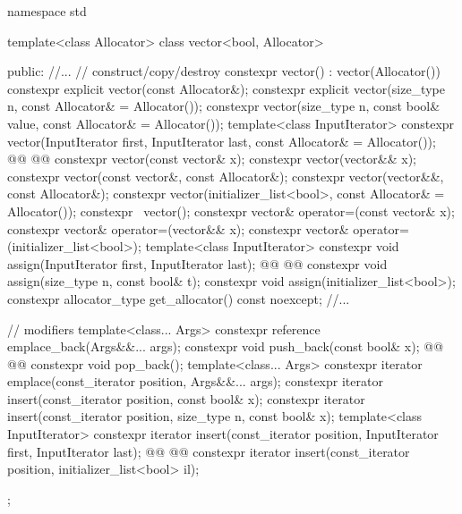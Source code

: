 \documentclass{wg21}
\begin{document}
\begin{codeblock}
namespace std {
    template<class Allocator>
    class vector<bool, Allocator> {
        public:
        //...
        // construct/copy/destroy
        constexpr vector() : vector(Allocator()) { }
        constexpr explicit vector(const Allocator&);
        constexpr explicit vector(size_type n, const Allocator& = Allocator());
        constexpr vector(size_type n, const bool& value, const Allocator& = Allocator());
        template<class InputIterator>
        constexpr vector(InputIterator first, InputIterator last, const Allocator& = Allocator());
        @@
        @@
        constexpr vector(const vector& x);
        constexpr vector(vector&& x);
        constexpr vector(const vector&, const Allocator&);
        constexpr vector(vector&&, const Allocator&);
        constexpr vector(initializer_list<bool>, const Allocator& = Allocator());
        constexpr ~vector();
        constexpr vector& operator=(const vector& x);
        constexpr vector& operator=(vector&& x);
        constexpr vector& operator=(initializer_list<bool>);
        template<class InputIterator>
        constexpr void assign(InputIterator first, InputIterator last);
        @@
        @@
        constexpr void assign(size_type n, const bool& t);
        constexpr void assign(initializer_list<bool>);
        constexpr allocator_type get_allocator() const noexcept;
        //...

        // modifiers
        template<class... Args> constexpr reference emplace_back(Args&&... args);
        constexpr void push_back(const bool& x);
        @@
        @@
        constexpr void pop_back();
        template<class... Args> constexpr iterator emplace(const_iterator position, Args&&... args);
        constexpr iterator insert(const_iterator position, const bool& x);
        constexpr iterator insert(const_iterator position, size_type n, const bool& x);
        template<class InputIterator>
        constexpr iterator insert(const_iterator position, InputIterator first, InputIterator last);
        @@
        @@
        constexpr iterator insert(const_iterator position, initializer_list<bool> il);
    };
}
\end{codeblock}%
\end{document}
